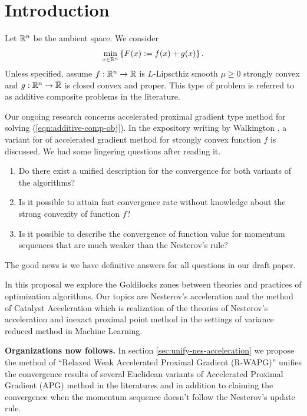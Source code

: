 \documentclass[12pt]{article}
\begin{document}
\section{Introduction}
    Let $\mathbb R^n$ be the ambient space. We consider 
    \begin{align}\label{eqn:additive-comp-obj}
        \min_{x \in \mathbb R^n} \left\lbrace
            F(x):= f(x) + g(x)
        \right\rbrace.
    \end{align}
    Unless specified, assume $f:\mathbb R^n \rightarrow \mathbb R$ is $L$-Lipscthiz smooth $\mu \ge 0$ strongly convex and $g:\mathbb R^n \rightarrow \overline {\mathbb R}$ is closed convex and proper. 
    This type of problem is referred to as additive composite problems in the literature. 
    \par
    Our ongoing research concerns accelerated proximal gradient type method for solving (\ref{eqn:additive-comp-obj}). 
    In the expository writing by Walkington \cite{noel_nesterovs_nodate}, a variant for of accelerated gradient method for strongly convex function $f$ is discussed. 
    We had some lingering questions after reading it. 
    \begin{enumerate}
        \item Do there exist a unified description for the convergence for both variants of the algorithms?
        \item Is it possible to attain fast convergence rate without knowledge about the strong convexity of function $f$?
        \item Is it possible to describe the convergence of function value for momentum sequences that are much weaker than the Nesterov's rule? 
    \end{enumerate}
    The good news is we have definitive answers for all questions in our draft paper. 
    \par
    In this proposal we explore the Goldilocks zones between theories and practices of optimization algorithms. 
    Our topics are Nesterov's acceleration and the method of Catalyst Acceleration which is realization of the theories of Nesterov's acceleration and inexact proximal point method in the settings of variance reduced method in Machine Learning. 
    \par
    \textbf{Organizations now follows.} 
    In section \ref{sec:unify-nes-acceleration} we propose the method of ``Relaxed Weak Accelerated Proximal Gradient (R-WAPG)'' unifies the convergence results of several Euclidean variants of Accelerated Proximal Gradient (APG) method in the literatures and in addition to claiming the convergence when the momentum sequence doesn't follow the Nesterov's update rule. 
\end{document}
